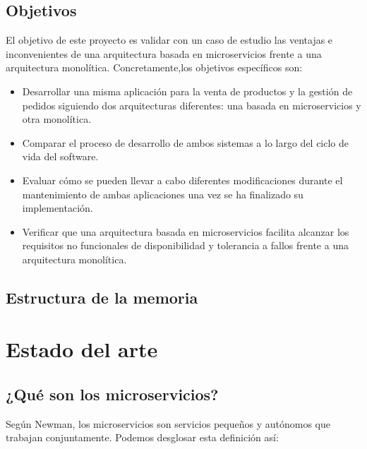 \documentclass[11pt,spanish,listoffigures,listoftables]{tfgetsinf}
\begin{document}
\section{Objetivos}

El objetivo de este proyecto es validar con un caso de estudio las ventajas e inconvenientes de una arquitectura basada en microservicios frente a una arquitectura monolítica. Concretamente,los objetivos específicos son:

\begin{itemize}

\item Desarrollar una misma aplicación para la venta de productos y la gestión de pedidos siguiendo dos arquitecturas diferentes: una basada en microservicios y otra monolítica.

\item Comparar el proceso de desarrollo de ambos sistemas a lo largo del ciclo de vida del software.

\item Evaluar cómo se pueden llevar a cabo diferentes modificaciones durante el mantenimiento de ambas aplicaciones una vez se ha finalizado su implementación.

\item Verificar que una arquitectura basada en microservicios facilita alcanzar los requisitos no funcionales de disponibilidad y tolerancia a fallos frente a una arquitectura monolítica.

\end{itemize}

\section{Estructura de la memoria}

\chapter{Estado del arte}

\section{¿Qué son los microservicios?}

Según Newman, los microservicios son servicios pequeños y autónomos que trabajan conjuntamente. \cite{Newman2015a} Podemos desglosar esta definición así:
\end{document}
